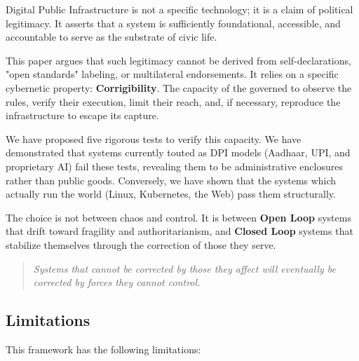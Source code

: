 Digital Public Infrastructure is not a specific technology; it is a claim of political legitimacy. It asserts that a system is sufficiently foundational, accessible, and accountable to serve as the substrate of civic life.

This paper argues that such legitimacy cannot be derived from self-declarations, "open standards" labeling, or multilateral endorsements. It relies on a specific cybernetic property: \textbf{Corrigibility}. The capacity of the governed to observe the rules, verify their execution, limit their reach, and, if necessary, reproduce the infrastructure to escape its capture.

We have proposed five rigorous tests to verify this capacity. We have demonstrated that systems currently touted as DPI models (Aadhaar, UPI, and proprietary AI) fail these tests, revealing them to be administrative enclosures rather than public goods. Conversely, we have shown that the systems which actually run the world (Linux, Kubernetes, the Web) pass them structurally.

The choice is not between chaos and control. It is between \textbf{Open Loop} systems that drift toward fragility and authoritarianism, and \textbf{Closed Loop} systems that stabilize themselves through the correction of those they serve.

\begin{quote}
\textit{Systems that cannot be corrected by those they affect will eventually be corrected by forces they cannot control.}
\end{quote}

\subsection{Limitations}

This framework has the following limitations:

